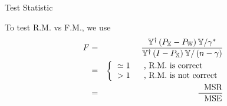 \documentclass{article}
\begin{document}
\bigskip

Test Statistic

\bigskip

To test R.M. vs F.M., we use%
\begin{eqnarray*}
F &=&\frac{\mathbb{Y}^{\dagger }\left( P_{\mathbb{X}}-P_{\mathbb{W}}\right) 
\mathbb{Y}/\gamma ^{\ast }}{\mathbb{Y}^{\dagger }\left( I-P_{\mathbb{X}%
}\right) \mathbb{Y}/\left( n-\gamma \right) } \\
&=&\left\{ 
\begin{tabular}{l}
$\simeq 1\quad \text{, R.M. is correct}$ \\ 
$>1\quad \text{, R.M. is not correct}$%
\end{tabular}%
\right.  \\
&=&\frac{\text{MSR}}{\text{MSE}}
\end{eqnarray*}
\end{document}

